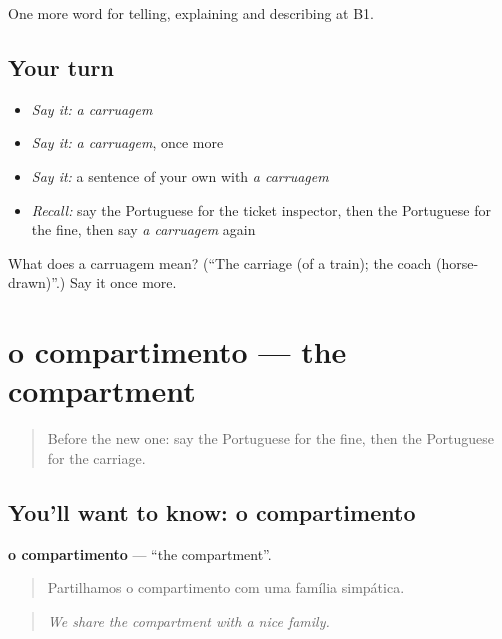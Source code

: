 \begin{grammarlens}[title={What you've built}]
One more word for telling, explaining and describing at B1.
\end{grammarlens}

\subsection*{Your turn}
\begin{itemize}
\raggedright
  \item \emph{Say it:} \emph{a carruagem}
  \item \emph{Say it:} \emph{a carruagem}, once more
  \item \emph{Say it:} a sentence of your own with \emph{a carruagem}
  \item \emph{Recall:} say the Portuguese for the ticket inspector, then the Portuguese for the fine, then say \emph{a carruagem} again
\end{itemize}

\begin{tcolorbox}[breakable,colback=teal!4,colframe=teal!35!black,title={Before you move on}]
What does a carruagem mean? (\textquotedblleft{}The carriage (of a train); the coach (horse-drawn)\textquotedblright{}.) Say it once more.
\end{tcolorbox}
\section[o compartimento]{o compartimento — the compartment}

\label{lesson:PT-C415-compartimento}



\begin{quote}
Before the new one: say the Portuguese for the fine, then the Portuguese for the carriage.
\end{quote}

\subsection*{You'll want to know: o compartimento}
\textbf{o compartimento} — \textquotedblleft{}the compartment\textquotedblright{}.

\begin{quote}
Partilhamos o compartimento com uma família simpática.
\end{quote}

\begin{quote}
\emph{We share the compartment with a nice family.}
\end{quote}

